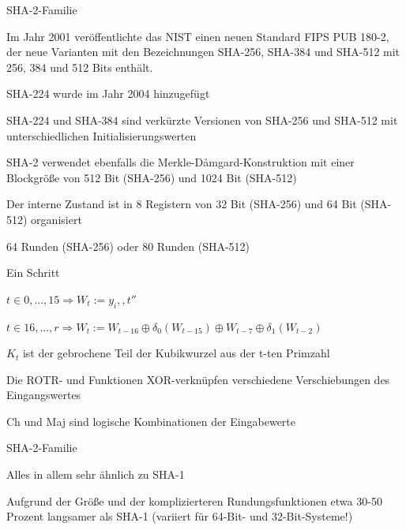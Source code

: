 \documentclass[a4paper]{article}
\begin{document}
\begin{multicols}{3}
\begin{itemize*}
\begin{itemize*}
            \end{itemize*}
            \item SHA-2-Familie
            \begin{itemize*}
                  \item Im Jahr 2001 veröffentlichte das NIST einen neuen Standard FIPS PUB 180-2, der neue Varianten mit den Bezeichnungen SHA-256, SHA-384 und SHA-512 mit 256, 384 und 512 Bits enthält.
                  \item SHA-224 wurde im Jahr 2004 hinzugefügt
                  \item SHA-224 und SHA-384 sind verkürzte Versionen von SHA-256 und SHA-512 mit unterschiedlichen Initialisierungswerten
                  \item SHA-2 verwendet ebenfalls die Merkle-Dåmgard-Konstruktion mit einer Blockgröße von 512 Bit (SHA-256) und 1024 Bit (SHA-512)
                  \item Der interne Zustand ist in 8 Registern von 32 Bit (SHA-256) und 64 Bit (SHA-512) organisiert
                  \item 64 Runden (SHA-256) oder 80 Runden (SHA-512)
            \end{itemize*}
            \item Ein Schritt
            \begin{itemize*}
                  \item $t\in{0, ..., 15}\Rightarrow W_t:=y_i,,t''$
                  \item $t\in{16, ..., r}\Rightarrow W_t:=W_{t-16}\oplus \delta_0(W_{t-15})\oplus W_{t-7}\oplus\delta_1(W_{t-2})$
                  \item $K_t$ ist der gebrochene Teil der Kubikwurzel aus der t-ten Primzahl
                  \item Die ROTR- und Funktionen XOR-verknüpfen verschiedene Verschiebungen des Eingangswertes
                  \item Ch und Maj sind logische Kombinationen der Eingabewerte
            \end{itemize*}
            \item SHA-2-Familie
            \begin{itemize*}
                  \item Alles in allem sehr ähnlich zu SHA-1
                  \item Aufgrund der Größe und der komplizierteren Rundungsfunktionen etwa 30-50 Prozent langsamer als SHA-1 (variiert für 64-Bit- und 32-Bit-Systeme!)

\end{itemize*}
\end{itemize*}
\end{multicols}
\end{document}
